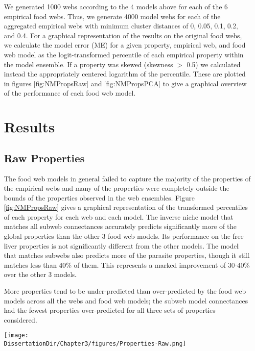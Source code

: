 \documentclass[/home/nkappler/Research/Dissertation/
 dissertation.tex]{subfiles}
\begin{document}
\begin{bibunit}
We generated 1000 webs according to the 4 models above for each of the 6
empirical food webs. Thus, we generate 4000 model webs for each of the
aggregated empirical webs with minimum cluster distances of 0, 0.05, 0.1, 0.2,
and 0.4. For a graphical representation of the results on the original food
webs, we calculate the model error (ME) for a given property, empirical web,
and food web model as the logit-transformed percentile of each empirical
property within the model ensemble. If a property was skewed (skewness $>$ 0.5)
we calculated instead the appropriately centered logarithm of the percentile.
These are plotted in figures \ref{fig:NMPropsRaw} and \ref{fig:NMPropsPCA} to
give a graphical overview of the performance of each food web model.

\section{Results}

\subsection{Raw Properties}

The food web models in general failed to capture the majority of the properties
of the empirical webs and many of the properties were completely outside the
bounds of the properties observed in the web ensembles. Figure
\ref{fig:NMPropsRaw} gives a graphical representation of the transformed
percentiles of each property for each web and each model. The inverse niche
model that matches all subweb connectances accurately predicts significantly
more of the global properties than the other 3 food web models. Its performance
on the free liver properties is not significantly different from the other
models. The model that matches subwebs also predicts more of the parasite
properties, though it still matches less than 40\% of them. This represents a
marked improvement of 30-40\% over the other 3 models.

More properties tend to be under-predicted than over-predicted by the food web
models across all the webs and food web models; the subweb model connectances
had the fewest properties over-predicted for all three sets of properties
considered. 

\begin{sidewaysfigure}
    \centering
    \texttt{[image: \\DissertationDir/Chapter3/figures/Properties-Raw.png]}
    \caption[Niche model properties predicted]{This figure shows logit transformed percentiles of the raw
        properties of the empirical webs within the model ensemble. The line of
        points at $\approx\pm$3.3 denote empirical properties completely
        outside the bounds of observed values in the web ensemble; the shading
        of these dots indicate the relative number of properties outside the
       range of the ensemble data.
    \label{fig:NMPropsRaw}}
 \end{sidewaysfigure}


\end{bibunit}
\end{document}
